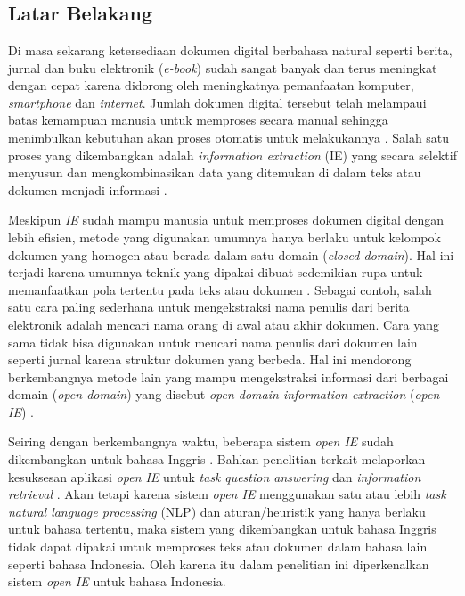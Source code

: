 \chapter{\babSatu}
\label{chap:babSatu}

\section{Latar Belakang}
Di masa sekarang ketersediaan dokumen digital berbahasa natural seperti berita, jurnal dan buku elektronik (\textit{e-book}) sudah sangat banyak dan terus meningkat dengan cepat karena didorong oleh meningkatnya pemanfaatan komputer, \textit{smartphone} dan \textit{internet}. Jumlah dokumen digital tersebut telah melampaui batas kemampuan manusia untuk memproses secara manual sehingga menimbulkan kebutuhan akan proses otomatis untuk melakukannya \citep{banko2007open}. Salah satu proses yang dikembangkan adalah \textit{information extraction} (IE) yang secara selektif menyusun dan mengkombinasikan data yang ditemukan di dalam teks atau dokumen menjadi informasi \citep{cowie1996information}.

Meskipun \textit{IE} sudah mampu manusia untuk memproses dokumen digital dengan lebih efisien, metode yang digunakan umumnya hanya berlaku untuk kelompok dokumen yang homogen atau berada dalam satu domain (\textit{closed-domain}). Hal ini terjadi karena umumnya teknik yang dipakai dibuat sedemikian rupa untuk memanfaatkan pola tertentu pada teks atau dokumen \citep{cowie1996information}. Sebagai contoh, salah satu cara paling sederhana untuk mengekstraksi nama penulis dari berita elektronik adalah mencari nama orang di awal atau akhir dokumen. Cara yang sama tidak bisa digunakan untuk mencari nama penulis dari dokumen lain seperti jurnal karena struktur dokumen yang berbeda. Hal ini mendorong berkembangnya metode lain yang mampu mengekstraksi informasi dari berbagai domain (\textit{open domain}) yang disebut \textit{open domain information extraction} (\textit{open IE}) \citep{banko2007open}.

Seiring dengan berkembangnya waktu, beberapa sistem \textit{open IE} sudah dikembangkan untuk bahasa Inggris \citep{banko2007open,schmitz2012open,angeli2015leveraging}. Bahkan penelitian terkait melaporkan kesuksesan aplikasi \textit{open IE} untuk \textit{task} \textit{question answering} \citep{fader2011identifying} dan \textit{information retrieval} \citep{etzioni2011search}. Akan tetapi karena sistem \textit{open IE} menggunakan satu atau lebih \textit{task natural language processing} (NLP) dan aturan/heuristik yang hanya berlaku untuk bahasa tertentu, maka sistem yang dikembangkan untuk bahasa Inggris tidak dapat dipakai untuk memproses teks atau dokumen dalam bahasa lain seperti bahasa Indonesia. Oleh karena itu dalam penelitian ini diperkenalkan sistem \textit{open IE} untuk bahasa Indonesia.

